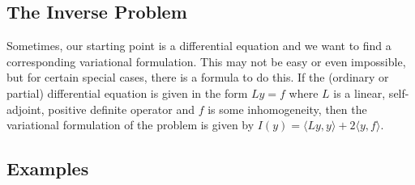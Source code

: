 

\subsection{The Inverse Problem}
Sometimes, our starting point is a differential equation and we want to find a corresponding variational formulation. This may not be easy or even impossible, but for certain special cases, there is a formula to do this. If the (ordinary or partial) differential equation is given in the form $L y = f$ where $L$ is a linear, self-adjoint, positive definite operator and $f$ is some inhomogeneity, then the variational formulation of the problem is given by $I(y) = \langle L y, y \rangle + 2 \langle y, f \rangle $.


\subsection{Examples}






